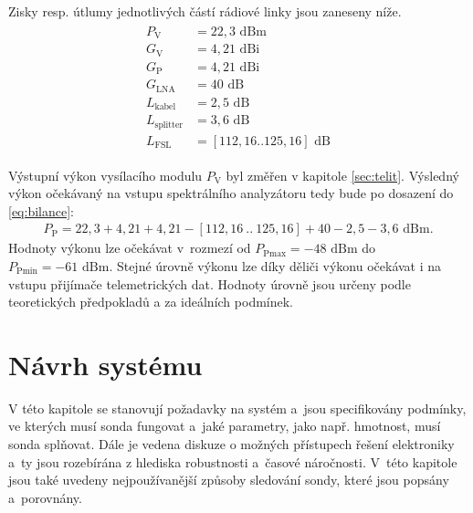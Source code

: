 \documentclass[twoside]{ctuthesis}
\newcommand{\mt}[1]{\text{#1}}
\theoremstyle{plain}
\theoremstyle{definition}
\theoremstyle{note}
\begin{document}
		Zisky resp. útlumy jednotlivých částí rádiové linky jsou zaneseny níže.
		\begin{align*}
			\begin{split}
				P_\mt{V} &= 22{,}3\mt{ dBm}\\
				G_\mt{V} &= 4{,}21\mt{ dBi}\\
				G_\mt{P} &= 4{,}21\mt{ dBi}\\
				G_\mt{LNA} &= 40 \mt{ dB}\\
				L_\mt{kabel} &= 2{,}5\mt{ dB}\\
				L_\mt{splitter} &= 3{,}6\mt{ dB}\\
				L_\mt{FSL} &= [112{,}16 .. 125{,}16]\mt{ dB}
			\end{split}
		\end{align*}

		Výstupní výkon vysílacího modulu $P_\mt{V}$ byl změřen v kapitole \ref{sec:telit}. Výsledný výkon očekávaný na vstupu spektrálního analyzátoru tedy bude po dosazení do \eqref{eq:bilance}:
		\begin{align}
			P_\mt{P} = 22{,}3 + 4{,}21 + 4{,}21 - [112{,}16~..~125{,}16] + 40 - 2{,}5 - 3{,}6\mt{ dBm}.
		\end{align}
		Hodnoty výkonu lze očekávat v~rozmezí od $P_\mt{Pmax} = -48\mt{ dBm}$ do $P_\mt{Pmin} = -61\mt{ dBm}$. Stejné úrovně výkonu lze díky děliči výkonu očekávat i na vstupu přijímače telemetrických dat. Hodnoty úrovně jsou určeny podle teoretických předpokladů a za ideálních podmínek. 















\chapter{Návrh systému}
V této kapitole se stanovují požadavky na systém a~jsou specifikovány podmínky, ve kterých musí sonda fungovat a~jaké parametry, jako např. hmotnost, musí sonda splňovat. Dále je vedena  diskuze o možných přístupech řešení elektroniky a~ty jsou rozebírána z hlediska robustnosti a~časové náročnosti. V~této kapitole jsou také uvedeny nejpoužívanější způsoby sledování sondy, které jsou popsány a~porovnány.
\end{document}
